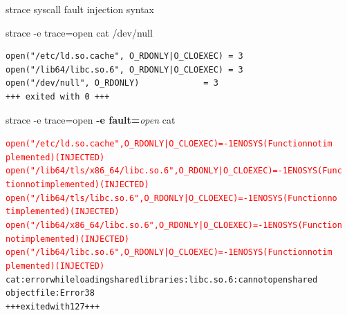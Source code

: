 \documentclass[unicode]{beamer}
\begin{document}
\begin{frame}[fragile]{strace syscall fault injection syntax}
\scriptsize
\begin{block}{\large strace -e trace=open cat /dev/null}
\begin{verbatim}
open("/etc/ld.so.cache", O_RDONLY|O_CLOEXEC) = 3
open("/lib64/libc.so.6", O_RDONLY|O_CLOEXEC) = 3
open("/dev/null", O_RDONLY)             = 3
+++ exited with 0 +++
\end{verbatim}
\end{block}
\begin{block}{\large strace -e trace=open {\bf -e fault=}{\it open} cat}
\begin{alltt}
\textcolor{red}{open("/etc/ld.so.cache", O_RDONLY|O_CLOEXEC) = -1 ENOSYS (Function not im
plemented) (INJECTED)}
\textcolor{red}{open("/lib64/tls/x86_64/libc.so.6", O_RDONLY|O_CLOEXEC) = -1 ENOSYS (Func
tion not implemented) (INJECTED)}
\textcolor{red}{open("/lib64/tls/libc.so.6", O_RDONLY|O_CLOEXEC) = -1 ENOSYS (Function no
t implemented) (INJECTED)}
\textcolor{red}{open("/lib64/x86_64/libc.so.6", O_RDONLY|O_CLOEXEC) = -1 ENOSYS (Function
 not implemented) (INJECTED)}
\textcolor{red}{open("/lib64/libc.so.6", O_RDONLY|O_CLOEXEC) = -1 ENOSYS (Function not im
plemented) (INJECTED)}
cat: error while loading shared libraries: libc.so.6: cannot open shared
object file: Error 38
+++ exited with 127 +++
\end{alltt}
\end{block}
\end{frame}
\end{document}
